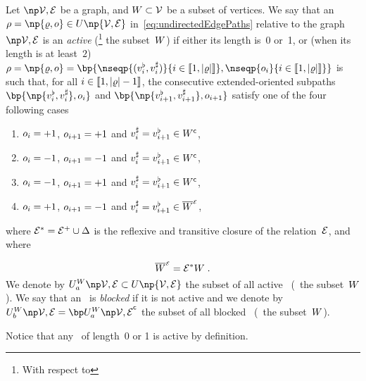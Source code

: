 \documentclass[12pt]{article}
\begin{document}
{{\begin{definition}
  \label{de:ActivePaths}
  Let \( \npOrientedGraph \) be a graph, 
  and $W\subset{\cal V}$ be a subset of vertices.
  We say that an  \undirectedEdgePath\
  \(\UndirectedPath=\np{\path,\orient} \in
  \UPATH\np{\OrientedGraph} \) in~\eqref{eq:undirectedEdgePaths}
  relative to the graph~\(\npOrientedGraph\)
  is an \emph{active \undirectedEdgePath} (\wrt\footnote{With respect to} the subset~$W$)
  if %
  either its length is~0 or~1,
  or (when its length is at least~$2$)
  \(\UndirectedPath=\np{\path,\orient}=\bp{\nseqp{(\tail{\vertex_i},\head{\vertex_i})}{i \in
      \ic{1,\cardinal{\path}}},\nseqp{\orient_i}{i \in \ic{1,\cardinal{\path}}}}\)
  is such that, for all $i\in \llbracket 1,{\lvert \varrho \rvert}-1 \rrbracket$, the consecutive extended-oriented subpaths
  \(\bp{\np{\tail{\vertex_i},\head{\vertex_i}}, \orient_i}\)  and
  \(\bp{\np{\tail{\vertex_{i+1}},\head{\vertex_{i+1}}}, \orient_{i+1}}\)
  satisfy one of the four following cases
  \begin{enumerate}
  \item
    $o_i = +1$, $o_{i+1}= +1$ and $v_i^{\sharp} = v_{i+1}^{\flat} \in W^{\mathsf{c}}$,
    \label{it:ActivePaths_case1}
  \item
    $o_i = -1$, $o_{i+1}= -1$ and $v_i^{\sharp} = v_{i+1}^{\flat} \in W^{\mathsf{c}}$,
    \label{it:ActivePaths_case2}
  \item
    $o_i = -1$, $o_{i+1}= +1$ and $v_i^{\sharp} = v_{i+1}^{\flat} \in W^{\mathsf{c}}$,
    \label{it:ActivePaths_case3}
  \item
    $o_i = +1$, $o_{i+1}= -1$ and $v_i^{\sharp} = v_{i+1}^{\flat} \in \overline{W}^{\text{\tiny ${\cal E}$}}$,
    \label{it:ActivePaths_case4}
  \end{enumerate}
  where \( {\cal E}^{*}= {\cal E}^{+} \cup \Delta \)
  is the reflexive and transitive closure of the relation~${\cal E}$,
  and where
  
  \begin{equation}
    \overline{W}^{\text{\tiny ${\cal E}$}}=
    {\cal E}^{*}W 
    \; .
    \label{eq:TransitiveReflexiveClosure_AgentSubsetW}
  \end{equation}
  We denote by \( \ActiveUndirectedPaths{\OrientedGraph} \subset \UPATH\np{\OrientedGraph}\)
  the subset of all active \undirectedEdgePaths\ (\wrt\ the subset~$W$). 
  We say that an \undirectedEdgePath\ is \emph{blocked} if it is not active
  and we denote by \( \BlockedUndirectedPaths{\OrientedGraph} = 
  \bpComplementary{\ActiveUndirectedPaths{\OrientedGraph}}\)   
  the subset of all blocked \undirectedEdgePaths\ (\wrt\ the subset~$W$).
\end{definition} 
Notice that any \undirectedEdgePath\ of length~0 or 1 is active by definition.

}}
\end{document}
